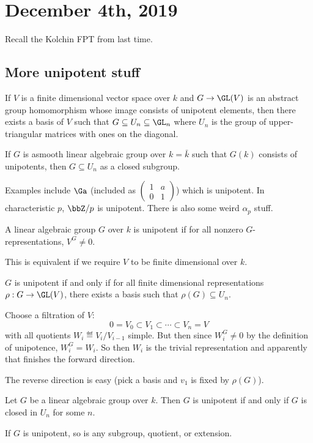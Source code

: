 \documentclass[12pt]{article}
\begin{document}
\section{December 4th, 2019}
Recall the Kolchin FPT from last time. 
\subsection{More unipotent stuff}
\begin{cor}
	If $V$ is a finite dimensional vector space over $k$ and $G\to\GL(V)$ is an abstract group homomorphism whose image consists of unipotent elements, then 
	there exists a basis of $V$ such that $G\subseteq U_n\subseteq\GL_n$ where $U_n$ is the group of upper-triangular matrices with ones on the diagonal.
\end{cor}
\begin{cor}
	If $G$ is asmooth linear algebraic group over $k=\bar k$ such that $G(k)$ consists of unipotents, then $G\subseteq U_n$ as a closed subgroup.
\end{cor}
Examples include $\Ga$ (included as $(\begin{smallmatrix}
	1&a\\0&1
\end{smallmatrix})$) which is unipotent. In characteristic $p$, $\bbZ/p$ is unipotent. There is also some weird $\alpha_p$ stuff.
\begin{defn}
	A linear algebraic group $G$ over $k$ is unipotent if for all nonzero $G$-representations, $V^G\ne 0$.
\end{defn}
\begin{rmk}
	This is equivalent if we require $V$ to be finite dimensional over $k$.
\end{rmk}
\begin{prop}
	$G$ is unipotent if and only if for all finite dimensional representations $\rho:G\to \GL(V)$, there exists a basis 
	such that $\rho(G)\subseteq U_n$.
\end{prop}
\begin{prf}
	Choose a filtration of $V$:
	\[0=V_0\subset V_1\subset\cdots\subset V_n=V\]
	with all quotients $W_i\eqdef V_i/V_{i-1}$ simple. But then since $W_i^G\ne 0$ by the definition of unipotence, $W_i^G=W_i$.
	So then $W_i$ is the trivial representation and apparently that finishes the forward direction.

	The reverse direction is easy (pick a basis and $v_1$ is fixed by $\rho(G)$).
\end{prf}
\begin{thm}
	Let $G$ be a linear algebraic group over $k$. Then $G$ is unipotent if and only if $G$ is closed in $U_n$ for some $n$.
\end{thm}
\begin{lem}
	If $G$ is unipotent, so is any subgroup, quotient, or extension.
\end{lem}
\end{document}
